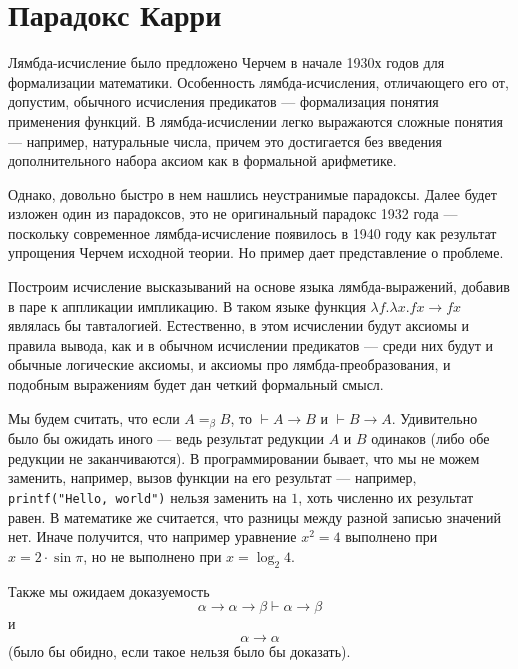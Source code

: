 \section{Парадокс Карри}

Лямбда-исчисление было предложено Черчем в начале 1930х годов 
для формализации математики. Особенность лямбда-исчисления, 
отличающего его от, допустим, обычного исчисления предикатов ---
формализация понятия применения функций. В лямбда-исчислении легко 
выражаются сложные понятия --- например, натуральные числа, 
причем это достигается без введения дополнительного набора аксиом
как в формальной арифметике.

Однако, довольно быстро в нем нашлись неустранимые парадоксы.
Далее будет изложен один из парадоксов, это не оригинальный парадокс
1932 года --- поскольку современное лямбда-исчисление появилось в 1940
году как результат упрощения Черчем исходной теории. Но пример 
дает представление о проблеме.

Построим исчисление высказываний на основе языка лямбда-выражений, 
добавив в паре к аппликации импликацию. 
В таком языке функция $\lambda f.\lambda x.f x \rightarrow f x$
являлась бы тавталогией. Естественно, в этом исчислении будут аксиомы
и правила вывода, как и в обычном исчислении предикатов --- среди них
будут и обычные логические аксиомы, и аксиомы про лямбда-преобразования, 
и подобным выражениям будет дан четкий формальный смысл.

Мы будем считать, что если $A=_\beta B$, то $\vdash A\rightarrow B$ и
$\vdash B\rightarrow A$.
Удивительно было бы ожидать иного --- ведь результат редукции $A$ и $B$ 
одинаков (либо обе редукции не заканчиваются). 
В программировании бывает, что мы не можем заменить, например,
вызов функции на его результат --- например, \texttt{printf("Hello, world")} нельзя 
заменить на $1$, хоть численно их результат равен.
В математике же считается, что разницы между разной записью значений нет.
Иначе получится, что например уравнение $ x^2 = 4 $ выполнено при $x = 2 \cdot \sin \pi$,
но не выполнено при $x = \log_2 4$.

Также мы ожидаем доказуемость 
$$\alpha\rightarrow\alpha\rightarrow\beta\vdash\alpha\rightarrow\beta$$ и
$$\alpha\rightarrow\alpha$$ (было бы обидно, если такое нельзя было бы доказать).


